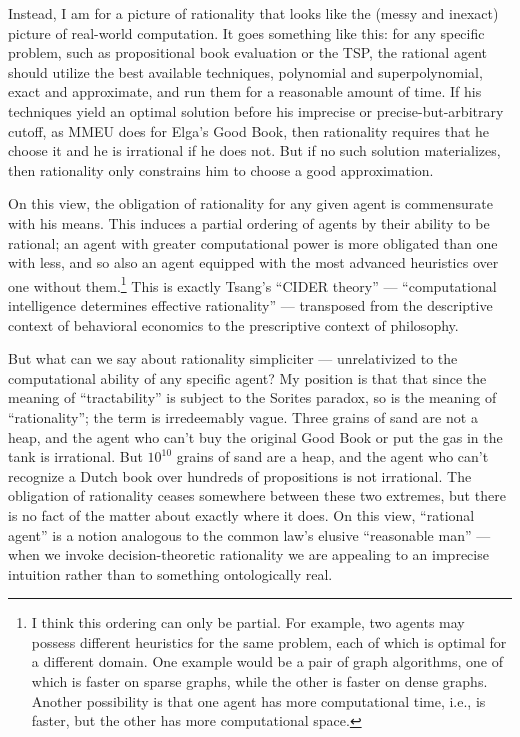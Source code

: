 \documentclass[letterpaper,12pt]{article}
\begin{document}
Instead, I am for a picture of rationality that looks like the (messy and inexact) picture of real-world computation. It goes something like this: for any specific problem, such as propositional book evaluation or the TSP, the rational agent should utilize the best available techniques, polynomial and superpolynomial, exact and approximate, and run them for a reasonable amount of time. If his techniques yield an optimal solution before his imprecise or precise-but-arbitrary cutoff, as MMEU does for Elga's Good Book, then rationality requires that he choose it and he is irrational if he does not. But if no such solution materializes, then rationality only constrains him to choose a good approximation.

On this view, the obligation of rationality for any given agent is commensurate with his means. This induces a partial ordering of agents by their ability to be rational; an agent with greater computational power is more obligated than one with less, and so also an agent equipped with the most advanced heuristics over one without them.\footnote{I think this ordering can only be partial. For example, two agents may possess different heuristics for the same problem, each of which is optimal for a different domain. One example would be a pair of graph algorithms, one of which is faster on sparse graphs, while the other is faster on dense graphs. Another possibility is that one agent has more computational time, i.e., is faster, but the other has more computational space.} This is exactly Tsang's ``CIDER theory'' --- ``computational intelligence determines effective rationality'' --- transposed from the descriptive context of behavioral economics to the prescriptive context of philosophy.

But what can we say about rationality simpliciter --- unrelativized to the computational ability of any specific agent? My position is that that since the meaning of ``tractability'' is subject to the Sorites paradox, so is the meaning of ``rationality''; the term is irredeemably vague. Three grains of sand are not a heap, and the agent who can't buy the original Good Book or put the gas in the tank is irrational. But $10^{10}$ grains of sand are a heap, and the agent who can't recognize a Dutch book over hundreds of propositions is not irrational. The obligation of rationality ceases somewhere between these two extremes, but there is no fact of the matter about exactly where it does. On this view, ``rational agent'' is a notion analogous to the common law's elusive ``reasonable man'' --- when we invoke decision-theoretic rationality we are appealing to an imprecise intuition rather than to something ontologically real.
\end{document}
